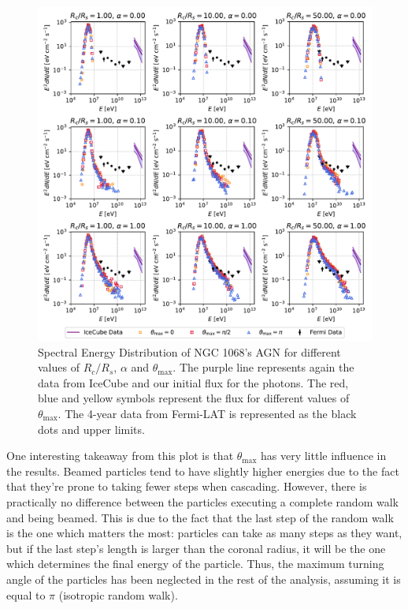 \begin{figure}[H]
    \includegraphics[width=\textwidth]{Figures/simulations_plot.pdf}
    \centering
    \caption{Spectral Energy Distribution of NGC 1068's AGN for different values of $R_c/R_s$, $\alpha$ and $\theta_{\max}$. The purple line represents again the data from IceCube and our initial flux for the photons. The red, blue and yellow symbols represent the flux for different values of $\theta_{\max}$. The 4-year data from Fermi-LAT is represented as the black dots and upper limits.}
    \label{fig:simulations}
\end{figure}

One interesting takeaway from this plot is that $\theta_{\max}$ has very little influence in the results. Beamed particles tend to have slightly higher energies due to the fact that they're prone to taking fewer steps when cascading. However, there is practically no difference between the particles executing a complete random walk and being beamed. This is due to the fact that the last step of the random walk is the one which matters the most: particles can take as many steps as they want, but if the last step's length is larger than the coronal radius, it will be the one which determines the final energy of the particle. Thus, the maximum turning angle of the particles has been neglected in the rest of the analysis, assuming it is equal to $\pi$ (isotropic random walk).

